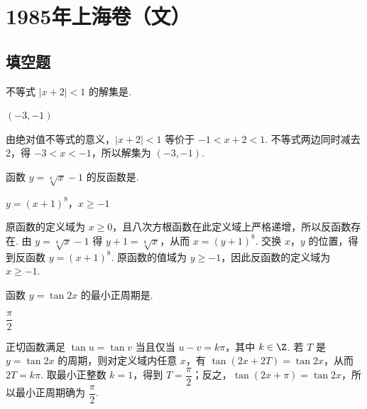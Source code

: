 \chapter{1985年上海卷（文）}

\section{填空题}

\begin{problem}

不等式 \(\left|x+2\right|<1\) 的解集是\fillinblank{}.

\begin{answer}
\(\left(-3,-1\right)\)
\end{answer}

\begin{solution}
由绝对值不等式的意义，\(\left|x+2\right|<1\) 等价于 \(-1<x+2<1\). 不等式两边同时减去 \(2\)，得 \(-3<x<-1\)，所以解集为 \(\left(-3,-1\right)\).
\end{solution}
\end{problem}

\begin{problem}

函数 \(y=\sqrt[8]{x}-1\) 的反函数是\fillinblank{}.

\begin{answer}
\(y=(x+1)^8\)，\(x\geqslant-1\)
\end{answer}

\begin{solution}
原函数的定义域为 \(x\geqslant0\)，且八次方根函数在此定义域上严格递增，所以反函数存在. 由 \(y=\sqrt[8]{x}-1\) 得 \(y+1=\sqrt[8]{x}\)，从而 \(x=(y+1)^8\). 交换 \(x\)，\(y\) 的位置，得到反函数 \(y=(x+1)^8\). 原函数的值域为 \(y\geqslant-1\)，因此反函数的定义域为 \(x\geqslant-1\).
\end{solution}
\end{problem}

\begin{problem}

函数 \(y=\tan 2x\) 的最小正周期是\fillinblank{}.

\begin{answer}
\(\dfrac{\pi}{2}\)
\end{answer}

\begin{solution}
正切函数满足 \(\tan u=\tan v\) 当且仅当 \(u-v=k\pi\)，其中 \(k\in\Z\). 若 \(T\) 是 \(y=\tan 2x\) 的周期，则对定义域内任意 \(x\)，有 \(\tan(2x+2T)=\tan 2x\)，从而 \(2T=k\pi\). 取最小正整数 \(k=1\)，得到 \(T=\dfrac{\pi}{2}\)；反之，\(\tan\left(2x+\pi\right)=\tan 2x\)，所以最小正周期确为 \(\dfrac{\pi}{2}\).
\end{solution}
\end{problem}

